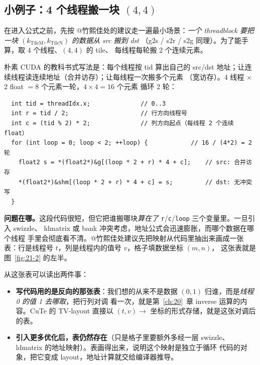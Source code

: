 \subsection{小例子：4 个线程搬一块 $(4,4)$}

在进入公式之前，先按 @竹熙佳处的建议走一遍最小场景：\emph{一个 threadblock
要把一块 $(k_{\mathrm{TileM}},k_{\mathrm{TileN}})$ 的数据从 src 搬到 dst}
（g2s / s2r / s2g 同理）。为了能手算，取 4 个线程、$(4,4)$ 的 tile、
每线程每轮搬 2 个连续元素。

朴素 CUDA 的教科书式写法是：每个线程按 tid 算出自己的
src/dst 地址；让连续线程读连续地址（合并访存）；让每线程一次搬多个元素
（宽访存）。4 线程 $\times$ 2 float $= 8$ 个元素一轮，$4\times4=16$ 个元素
循环 2 轮：

\begin{lstlisting}
  int tid = threadIdx.x;              // 0..3
  int r = tid / 2;                    // 行方向线程号
  int c = (tid % 2) * 2;              // 列方向起点（每线程 2 个连续 float）
  for (int loop = 0; loop < 2; ++loop) {            // 16 / (4*2) = 2 轮
    float2 s = *(float2*)&g[(loop * 2 + r) * 4 + c];    // src: 合并访存
    *(float2*)&shm[(loop * 2 + r) * 4 + c] = s;         // dst: 无冲突写
  }
\end{lstlisting}

\textbf{问题在哪。}这段代码很短，但它把谁搬哪块\emph{算在了}
\texttt{r}/\texttt{c}/\texttt{loop} 三个变量里。一旦引入 swizzle、
ldmatrix 或 bank 冲突考虑，地址公式会迅速膨胀，而哪个数据在哪个线程
手里会彻底看不清。@竹熙佳处建议先把映射从代码里抽出来画成一张
表：行是线程号 $t$，列是线程内的值号 $v$，格子填数据坐标 $(m,n)$，
这张表就是图~\ref{fig:21-2} 的左半。

从这张表可以读出两件事：

\begin{itemize}
  \item \textbf{写代码用的是反向的那张表}：我们想的从来不是数据
        $(0,1)$ 归谁，而是\emph{线程 0 的值 1 去哪取}，把行列对调
        看一次，就是第~\ref{ch:20}~章 inverse 运算的内容。CuTe 的
        TV-layout 直接以 $(t,v)\to$ 坐标的形式存储，就是这张对调后的表。
  \item \textbf{引入更多优化后，表仍然存在}（只是格子里要额外多经一层 swizzle、
        ldmatrix 的地址映射）。表画得出来，说明这个映射是独立于循环
        代码的对象，把它变成 layout，地址计算就交给编译器推导。
\end{itemize}


